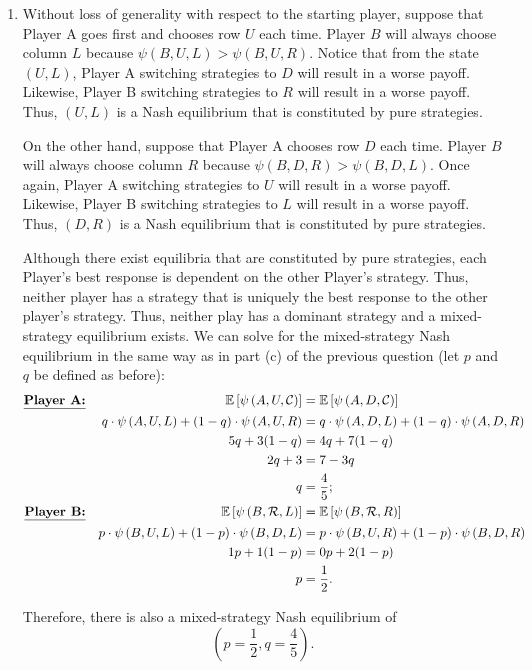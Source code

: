 \documentclass{article}
\newcommand{\pay}[3]{\psi\left(#1,#2,#3\right)}
\newcommand{\expp}[1]{\mathbb{E}\left[ #1 \right]}
\begin{document}
\begin{enumerate}
    \item Without loss of generality with respect to the starting player, suppose that Player A goes first and chooses row $U$ each time. Player $B$ will always choose column $L$ because $\pay{B}{U}{L}>\pay{B}{U}{R}$. Notice that from the state $(U,L)$, Player A switching strategies to $D$ will result in a worse payoff. Likewise, Player B switching strategies to $R$ will result in a worse payoff. Thus, $(U,L)$ is a Nash equilibrium that is constituted by pure strategies.
    
    On the other hand, suppose that Player A chooses row $D$ each time. Player $B$ will always choose column $R$ because $\pay{B}{D}{R}>\pay{B}{D}{L}$. Once again, Player A switching strategies to $U$ will result in a worse payoff. Likewise, Player B switching strategies to $L$ will result in a worse payoff. Thus, $(D,R)$ is a Nash equilibrium that is constituted by pure strategies.

    Although there exist equilibria that are constituted by pure strategies, each Player's best response is dependent on the other Player's strategy. Thus, neither player has a strategy that is uniquely the best response to the other player's strategy. Thus, neither play has a dominant strategy and a mixed-strategy equilibrium exists. We can solve for the mixed-strategy Nash equilibrium in the same way as in part (c) of the previous question (let $p$ and $q$ be defined as before):
    \begin{align*}
        \textbf{\underline{Player A:}} && \expp{\pay{A}{U}{\mathcal{C}}} & =\expp{\pay{A}{D}{\mathcal{C}}} \\
        && q\cdot\pay{A}{U}{L} + (1-q)\cdot\pay{A}{U}{R} & =q\cdot\pay{A}{D}{L} + (1-q)\cdot\pay{A}{D}{R} \\
        && 5q + 3(1-q) & =4q + 7(1-q) \\
        && 2q+3 & =7-3q \\
        && q & =\frac{4}{5}; \\
        \textbf{\underline{Player B:}} && \expp{\pay{B}{\mathcal{R}}{L}} & =\expp{\pay{B}{\mathcal{R}}{R}} \\
        && p\cdot\pay{B}{U}{L} + (1-p)\cdot\pay{B}{D}{L} & =p\cdot\pay{B}{U}{R} + (1-p)\cdot\pay{B}{D}{R} \\
        && 1p+1(1-p) & =0p+2(1-p) \\
        && p & =\frac{1}{2}.
    \end{align*}

    Therefore, there is also a mixed-strategy Nash equilibrium of 
    $$(p=\frac{1}{2},q=\frac{4}{5}).$$
\end{enumerate}
\end{document}
